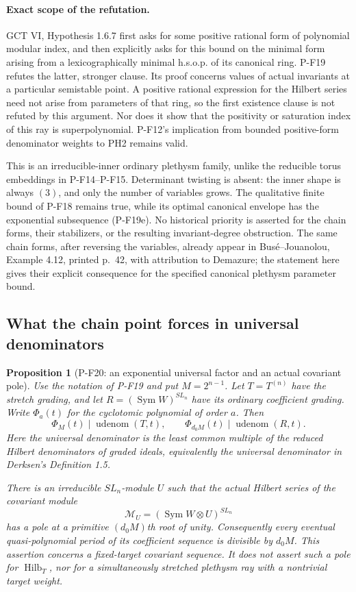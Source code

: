\documentclass[11pt,a4paper]{article}
\newtheorem{proposition}{Proposition}[section]
\begin{document}
\paragraph{Exact scope of the refutation.}
GCT VI, Hypothesis 1.6.7 first asks for some positive rational
form of polynomial modular index, and then explicitly asks for
this bound on the minimal form arising from a lexicographically
minimal h.s.o.p. of its canonical ring. P-F19 refutes the latter,
stronger clause. Its proof concerns values of actual invariants
at a particular semistable point. A positive rational expression
for the Hilbert series need not arise from parameters of that
ring, so the first existence clause is not refuted by this
argument. Nor does it show that the positivity or saturation
index of this ray is superpolynomial. P-F12's implication from
bounded positive-form denominator weights to PH2 remains valid.

This is an irreducible-inner ordinary plethysm family, unlike
the reducible torus embeddings in P-F14--P-F15. Determinant
twisting is absent: the inner shape is always $(3)$, and only
the number of variables grows. The qualitative finite bound
of P-F18 remains true, while its optimal canonical envelope
has the exponential subsequence (P-F19e). No historical
priority is asserted for the chain forms, their stabilizers,
or the resulting invariant-degree obstruction. The same chain
forms, after reversing the variables, already appear in
Bus\'e--Jouanolou, Example 4.12, printed p.~42, with attribution
to Demazure; the statement here gives their explicit consequence
for the specified canonical plethysm parameter bound.


\subsection{What the chain point forces in universal denominators}

\begin{proposition}[P-F20: an exponential universal factor and an actual covariant pole]
\label{prop:chainuniversaldenominator}
Use the notation of P-F19 and put $M=2^{n-1}$.
Let $T=T^{(n)}$ have the stretch grading, and let
$R=(\operatorname{Sym}W)^{SL_n}$ have its ordinary coefficient grading.
Write $\Phi_a(t)$ for the cyclotomic polynomial of order $a$.
Then
\[
 \Phi_M(t)\mid\operatorname{udenom}(T,t),\qquad
 \Phi_{d_0M}(t)\mid\operatorname{udenom}(R,t).
 \tag{P-F20a}
\]
Here the universal denominator is the least common multiple of the
reduced Hilbert denominators of graded ideals, equivalently the
universal denominator in Derksen's Definition 1.5.

There is an irreducible $SL_n$-module $U$ such that the actual Hilbert
series of the covariant module
\[
 \mathcal M_U=(\operatorname{Sym}W\otimes U)^{SL_n}
 \tag{P-F20b}
\]
has a pole at a primitive $(d_0M)$th root of unity.
Consequently every eventual quasi-polynomial period of its coefficient
sequence is divisible by $d_0M$.
This assertion concerns a fixed-target covariant sequence. It does
not assert such a pole for $\operatorname{Hilb}_T$, nor for a
simultaneously stretched plethysm ray with a nontrivial target weight.
\end{proposition}
\end{document}
